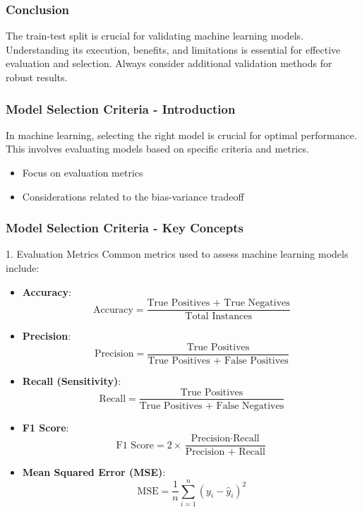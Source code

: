 \documentclass[aspectratio=169]{beamer}
\begin{document}
\begin{frame}
    \frametitle{Conclusion}
    The train-test split is crucial for validating machine learning models. Understanding its execution, benefits, and limitations is essential for effective evaluation and selection. Always consider additional validation methods for robust results.
\end{frame}

\begin{frame}[fragile]
    \frametitle{Model Selection Criteria - Introduction}
    In machine learning, selecting the right model is crucial for optimal performance. 
    This involves evaluating models based on specific criteria and metrics.
    \begin{itemize}
        \item Focus on evaluation metrics
        \item Considerations related to the bias-variance tradeoff
    \end{itemize}
\end{frame}

\begin{frame}[fragile]
    \frametitle{Model Selection Criteria - Key Concepts}
    \begin{block}{1. Evaluation Metrics}
        Common metrics used to assess machine learning models include:
        \begin{itemize}
            \item \textbf{Accuracy}: 
            \[
            \text{Accuracy} = \frac{\text{True Positives + True Negatives}}{\text{Total Instances}}
            \]
            \item \textbf{Precision}: 
            \[
            \text{Precision} = \frac{\text{True Positives}}{\text{True Positives + False Positives}}
            \]
            \item \textbf{Recall (Sensitivity)}: 
            \[
            \text{Recall} = \frac{\text{True Positives}}{\text{True Positives + False Negatives}}
            \]
            \item \textbf{F1 Score}:
            \[
            \text{F1 Score} = 2 \times \frac{\text{Precision} \cdot \text{Recall}}{\text{Precision + Recall}}
            \]
            \item \textbf{Mean Squared Error (MSE)}:
            \[
            \text{MSE} = \frac{1}{n} \sum_{i=1}^{n} (y_i - \hat{y}_i)^2
            \]
        \end{itemize}
    \end{block}
\end{frame}
\end{document}
